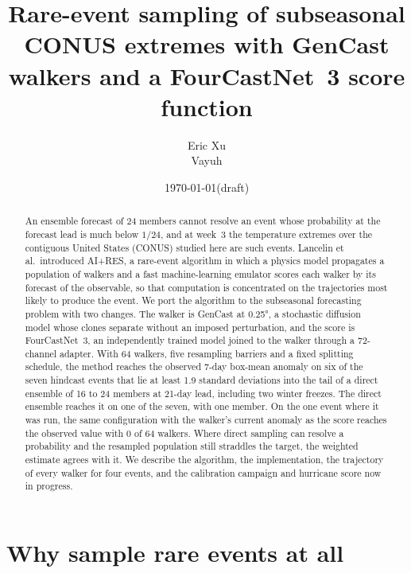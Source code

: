 \documentclass[10pt,twocolumn]{article}
\title{\Large Rare-event sampling of subseasonal CONUS extremes with GenCast walkers and a FourCastNet~3 score function}
\author{Eric Xu\\[2pt]\normalsize Vayuh \verify{affiliation}}
\date{\normalsize \today\quad(draft)}
\begin{document}
\maketitle

\begin{abstract}
\noindent
An ensemble forecast of 24 members cannot resolve an event whose probability at the forecast lead is much below $1/24$, and at week~3 the temperature extremes over the contiguous United States (CONUS) studied here are such events. Lancelin et al.\ introduced AI+RES, a rare-event algorithm in which a physics model propagates a population of walkers and a fast machine-learning emulator scores each walker by its forecast of the observable, so that computation is concentrated on the trajectories most likely to produce the event. We port the algorithm to the subseasonal forecasting problem with two changes. The walker is GenCast at 0.25\si{\degree}, a stochastic diffusion model whose clones separate without an imposed perturbation, and the score is FourCastNet~3, an independently trained model joined to the walker through a 72-channel adapter. With 64 walkers, five resampling barriers and a fixed splitting schedule, the method reaches the observed 7-day box-mean anomaly on six of the seven hindcast events that lie at least 1.9 standard deviations into the tail of a direct ensemble of 16 to 24 members at 21-day lead, including two winter freezes. The direct ensemble reaches it on one of the seven, with one member. On the one event where it was run, the same configuration with the walker's current anomaly as the score reaches the observed value with 0 of 64 walkers. Where direct sampling can resolve a probability and the resampled population still straddles the target, the weighted estimate agrees with it. We describe the algorithm, the implementation, the trajectory of every walker for four events, and the calibration campaign and hurricane score now in progress.
\end{abstract}

\section{Why sample rare events at all}
\label{sec:why}
\end{document}
